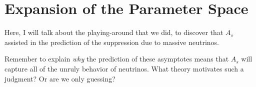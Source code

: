 \chapter{Expansion of the Parameter Space}

Here, I will talk about the playing-around that we did, to discover that $A_s$ assisted in the prediction of the suppression due to massive neutrinos.

Remember to explain \textit{why} the prediction of these asymptotes means that $A_s$ will capture all of the unruly behavior of neutrinos. What theory motivates such a judgment? Or are we only guessing?